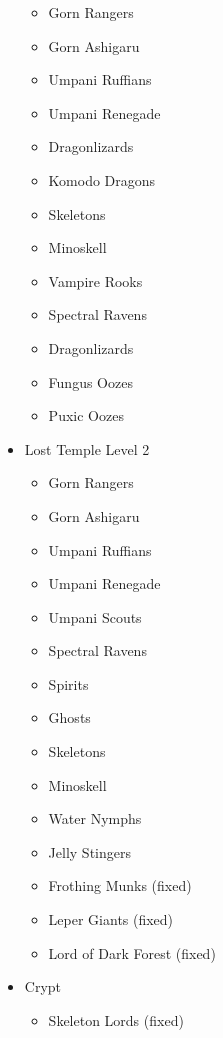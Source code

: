 \documentclass[12pt]{article}
\providecommand{\tightlist}{%
  \setlength{\itemsep}{0pt}\setlength{\parskip}{0pt}}
\begin{document}
\begin{multicols}{2}
\begin{itemize}
\begin{itemize}
\tightlist
\item
  Gorn Rangers
\item
  Gorn Ashigaru
\item
  Umpani Ruffians
\item
  Umpani Renegade
\item
  Dragonlizards
\item
  Komodo Dragons
\item
  Skeletons
\item
  Minoskell
\item
  Vampire Rooks
\item
  Spectral Ravens
\item
  Dragonlizards
\item
  Fungus Oozes
\item
  Puxic Oozes
\end{itemize}

\item Lost Temple Level 2

\begin{itemize}
\tightlist
\item
  Gorn Rangers
\item
  Gorn Ashigaru
\item
  Umpani Ruffians
\item
  Umpani Renegade
\item
  Umpani Scouts
\item
  Spectral Ravens
\item
  Spirits
\item
  Ghosts
\item
  Skeletons
\item
  Minoskell
\item
  Water Nymphs
\item
  Jelly Stingers
\item
  Frothing Munks (fixed)
\item
  Leper Giants (fixed)
\item
  Lord of Dark Forest (fixed)
\end{itemize}

\item Crypt

\begin{itemize}
\tightlist
\item
  Skeleton Lords (fixed)
\end{itemize}
\end{itemize}
\end{multicols}
\end{document}
